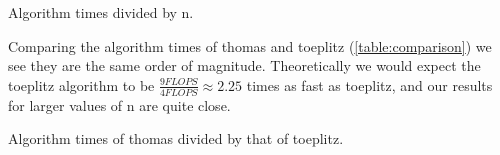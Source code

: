 \begin{table}[htp]
  \centering
  \caption{Algorithm times divided by n.}
  \label{table:normalized}
\end{table}


Comparing the algorithm times of thomas and toeplitz (\cref{table:comparison})
we see they are the same order of magnitude. Theoretically we would
expect the toeplitz algorithm to be $\frac{9 FLOPS}{4 FLOPS} \approx 2.25$ times as fast as
toeplitz, and our results for larger values of n are quite close.

\begin{table}[htp]
  \centering
  \caption{Algorithm times of thomas divided by that of toeplitz.}
  \label{table:comparison}
\end{table}
